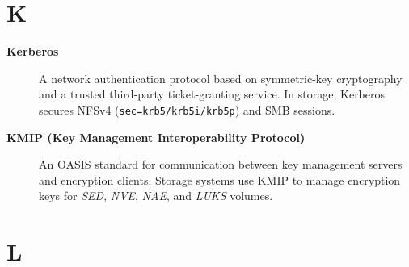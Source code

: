 \section*{K}

\begin{description}

\item[\textbf{Kerberos}]
A network authentication protocol based on symmetric-key cryptography and a
trusted third-party ticket-granting service. In storage, Kerberos secures
NFSv4 (\texttt{sec=krb5/krb5i/krb5p}) and SMB sessions.

\item[\textbf{KMIP (Key Management Interoperability Protocol)}]
An OASIS standard for communication between key management servers and
encryption clients. Storage systems use KMIP to manage encryption keys for
\textit{SED}, \textit{NVE}, \textit{NAE}, and \textit{LUKS} volumes.

\end{description}

\section*{L}


